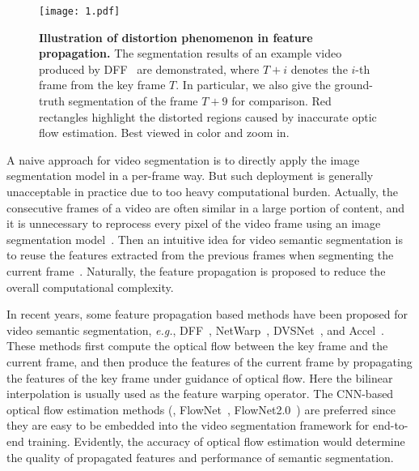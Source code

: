 \documentclass[journal]{IEEEtran}
\begin{document}
\begin{figure}[t]
	\begin{center}
		\texttt{[image: 1.pdf]}
	\end{center}
	\caption{\textbf{Illustration of distortion phenomenon in feature propagation.} The segmentation results of an example video produced by DFF~\cite{zhu2017deep} are demonstrated, where $T+i$ denotes the $i$-th frame from the key frame $T$. In particular, we also give the ground-truth segmentation of the frame $T+9$ for comparison. Red rectangles highlight the distorted regions caused by inaccurate optic flow estimation. Best viewed in color and zoom in.}
	\label{dff_distortion}
\end{figure}


A naive approach for video segmentation is to directly apply the image segmentation model in a per-frame way. But such deployment is generally unacceptable in practice due to too heavy computational burden. Actually, the consecutive frames of a video are often similar in a large portion of content, and it is unnecessary to reprocess every pixel of the video frame using an image segmentation model~\cite{xu2018dynamic}. Then an intuitive idea for video semantic segmentation is to reuse the features extracted from the previous frames when segmenting the current frame~\cite{zhu2017deep}. Naturally, the feature propagation is proposed to reduce the overall computational complexity.

\IEEEpubidadjcol

In recent years, some feature propagation based methods have been proposed for video semantic segmentation, \textit{e.g.}, DFF~\cite{zhu2017deep}, NetWarp~\cite{gadde2017semantic}, DVSNet~\cite{xu2018dynamic}, and Accel~\cite{jain2019accel}. These methods first compute the optical flow between the key frame and the current frame, and then produce the features of the current frame by propagating the features of the key frame under guidance of optical flow. Here the bilinear interpolation is usually used as the feature warping operator. The CNN-based optical flow estimation methods (\eg, FlowNet~\cite{dosovitskiy2015flownet,ilg2017flownet}, FlowNet2.0~\cite{ilg2017flownet}) are preferred since they are easy to be embedded into the video segmentation framework for end-to-end training. Evidently, the accuracy of optical flow estimation would determine the quality of propagated features and performance of semantic segmentation. 
\end{document}
